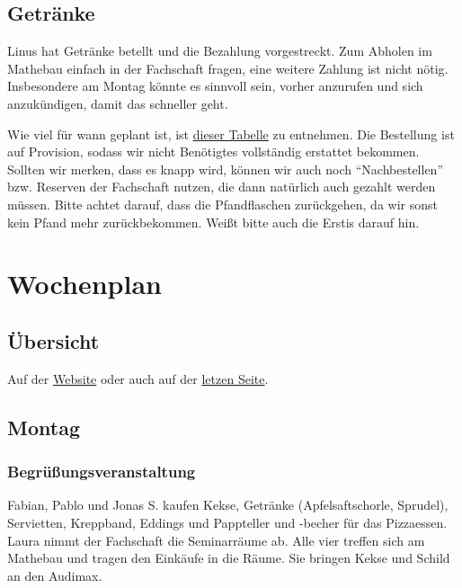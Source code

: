 \documentclass[10pt,ngerman]{scrartcl}
\begin{document}
\begin{multicols}{2}
\subsection{Getränke}\label{drinks}

Linus hat Getränke betellt und die Bezahlung vorgestreckt.
Zum Abholen im Mathebau einfach in der Fachschaft fragen, eine weitere Zahlung ist nicht nötig.
Insbesondere am Montag könnte es sinnvoll sein, vorher anzurufen und sich anzukündigen, damit das schneller geht.

Wie viel für wann geplant ist, ist \href{https://docs.google.com/spreadsheets/d/1p1hiGPHs2fquxRcn8Yz74vaicJAu-LVF3NOmNHuNc6g/edit?usp=sharing}{dieser Tabelle} zu entnehmen.
Die Bestellung ist auf Provision, sodass wir nicht Benötigtes vollständig erstattet bekommen.
Sollten wir merken, dass es knapp wird, können wir auch noch ``Nachbestellen'' bzw. Reserven der Fachschaft nutzen, die dann natürlich auch gezahlt werden müssen.
Bitte achtet darauf, dass die Pfandflaschen zurückgehen, da wir sonst kein Pfand mehr zurückbekommen.
Weißt bitte auch die Erstis darauf hin.

\section{Wochenplan}

\subsection{Übersicht}

Auf der \href{https://studierlangsam.de/wochenplan}{Website} oder auch auf der \hyperref[LastPage]{letzen Seite}.


\subsection{Montag}

\subsubsection{Begrüßungsveranstaltung}

Fabian, Pablo und Jonas S. kaufen Kekse, Getränke (Apfelsaftschorle,
Sprudel), Servietten, Kreppband, Eddings und Pappteller und -becher
für das Pizzaessen. Laura nimmt der Fachschaft die Seminarräume ab.
Alle vier treffen sich am Mathebau und tragen den Einkäufe in die
Räume. Sie bringen Kekse und Schild an den Audimax.


\end{multicols}
\end{document}
